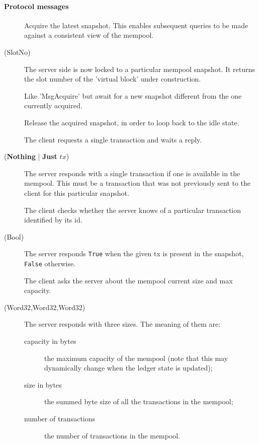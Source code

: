 \paragraph{Protocol messages}
\begin{description}
  \item[\MsgAcquire{}] Acquire the latest snapshot. This enables subsequent
    queries to be made against a consistent view of the mempool.
  \item[\MsgAcquired{} {\boldmath (SlotNo)}] The server side is now locked to
    a particular mempool snapshot. It returns the slot number of the 'virtual
    block' under construction.
  \item[\MsgAwaitAcquire{}] Like 'MsgAcquire' but await for a new snapshot
    different from the one currently acquired.
  \item[\MsgRelease{}] Release the acquired snapshot, in order to loop back to
    the idle state.
  \item[\MsgNextTx{}] The client requests a single transaction and waits
    a reply.
  \item[\MsgReplyNextTx{} \boldmath(\textbf{Nothing} | \textbf{Just} $tx$)] The
    server responds with a single transaction if one is available in the
    mempool. This must be a transaction that was not previously sent to the
    client for this particular snapshot.
  \item[\MsgHasTx{}] The client checks whether the server knows of a particular
    transaction identified by its id.
  \item[\MsgReplyHasTx{} (Bool)] The server responds \texttt{True} when the given tx
    is present in the snapshot, \texttt{False} otherwise.
  \item[\MsgGetSizes{}] The client asks the server about the mempool current
    size and max capacity.
  \item[\MsgReplyGetSizes{} (Word32,Word32,Word32)] The server responds with
    three sizes.  The meaning of them are:
    \begin{description}
      \item[capacity in bytes] the maximum capacity of the mempool {\small (note that
        this may dynamically change when the ledger state is updated)};
      \item[size in bytes] the summed byte size of all the transactions in the
        mempool;
      \item[number of transactions] the number of transactions in the mempool.
    \end{description}
\end{description}

